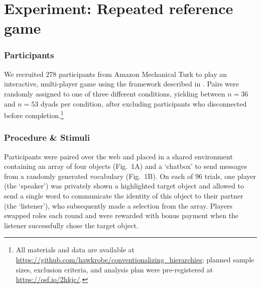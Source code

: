 \documentclass[10pt,letterpaper]{article}
\begin{document}



			
\section{Experiment: Repeated reference game}

\subsubsection{Participants}

We recruited 278 participants from Amazon Mechanical Turk to play an interactive, multi-player game using the framework described in . Pairs were randomly assigned to one of three different conditions, yielding between $n=36$ and $n=53$ dyads per condition, after excluding participants who disconnected before completion.\footnote{All materials and data are available at \url{https://github.com/hawkrobe/conventionalizing_hierarchies}; planned sample sizes, exclusion criteria, and analysis plan were pre-registered at \url{https://osf.io/2hkjc/}.}

\subsubsection{Procedure \& Stimuli}
Participants were paired over the web and placed in a shared environment containing an array of four objects (Fig.\ 1A) and a `chatbox' to send messages from a randomly generated vocabulary (Fig.\ 1B). On each of 96 trials, one player (the `speaker') was privately shown a highlighted target object and allowed to send a single word to communicate the identity of this object to their partner (the `listener'), who subsequently made a selection from the array. Players swapped roles each round and were rewarded with bonus payment when the listener successfully chose the target object.
\end{document}

